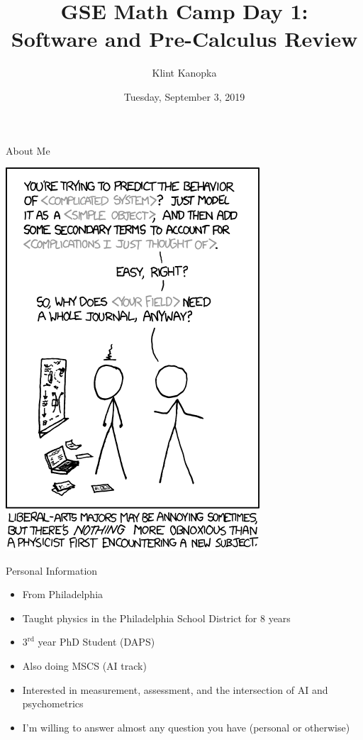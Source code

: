 \documentclass[]{beamer}
\title[GSE Math Camp: Day 1]{GSE Math Camp Day 1: \\ Software and Pre-Calculus Review}
\author{Klint Kanopka}
\institute{kkanopka@stanford.edu}
\date{Tuesday, September 3, 2019}
\begin{document}
    \begin{frame}
      \titlepage
    \end{frame}

    \begin{frame}{About Me}
        \begin{center}
        \includegraphics[scale=0.4]{img/physicists.png}
        \end{center}
    \end{frame}

    \begin{frame}{Personal Information}
        \begin{itemize}
            \item From Philadelphia
            \item Taught physics in the Philadelphia School District for 8 years
            \item $3^{\text{rd}}$ year PhD Student (DAPS)
            \item Also doing MSCS (AI track)
            \item Interested in measurement, assessment, and the intersection of AI and psychometrics
            \item I'm willing to answer almost any question you have (personal or otherwise)
        \end{itemize}
    \end{frame}
\end{document}
